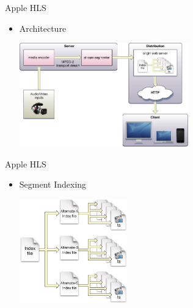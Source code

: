 \documentclass{beamer}
\begin{document}
\begin{frame}{Apple HLS}
\begin{itemize}
\item Architecture
\begin{center}
\includegraphics[height=4.5cm]{fig/hls_arch.jpg}
\end{center}
\end{itemize}
\end{frame}
\begin{frame}{Apple HLS}
\begin{itemize}
\item Segment Indexing
\begin{center}
\includegraphics[height=4.5cm]{fig/hls_indexing.jpg}
\end{center}
\end{itemize}
\end{frame}
\end{document}
